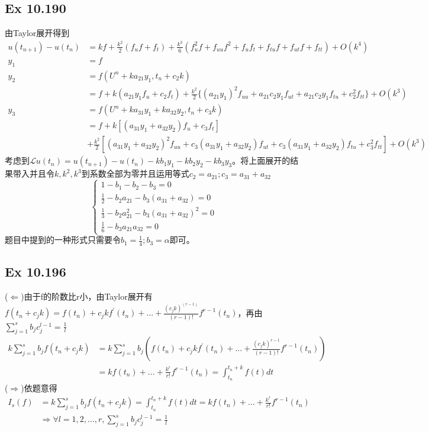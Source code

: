 \documentclass{article}
\begin{document}
\subsection*{Ex 10.190}
\indent 由Taylor展开得到
\begin{equation*}
  \begin{aligned}
    	u(t_{n+1})-u(t_{n})&=kf+\frac{k^2}{2}(f_{u}f+f_{t})+\frac{k^3}{6}(f_{u}^{2}f+f_{uu}f^2+f_{u}f_{t}+f_{tu}f+f_{ut}f+f_{tt})+O(k^4)\\
	y_1&=f\\
	y_2&=f(U^n+ka_{21}y_1,t_n+c_2k)\\
	     &=f+k(a_{21}y_1f_u+c_2f_t)+\frac{k^2}{2}\{(a_{21}y_1)^2f_{uu}+a_{21}c_2y_1f_{ut}+a_{21}c_2y_1f_{tu}+c_2^2f_{tt}\}+O(k^3)\\
	y_3&=f(U^n+ka_{31}y_1+ka_{32}y_2,t_n+c_3k)\\
	     &=f+k[(a_{31}y_1+a_{32}y_2)f_u+c_3f_t]\\
	     &+\frac{k^2}{2}[(a_{31}y_1+a_{32}y_2)^2f_{uu}+c_3(a_{31}y_1+a_{32}y_2)f_{ut}+c_3(a_{31}y_1+a_{32}y_2)f_{tu}+c_3^2f_{tt}]+O(k^3)
  \end{aligned}
\end{equation*}
考虑到$\mathcal{L}u(t_n)=u(t_{n+1})-u(t_n)-kb_1y_1-kb_2y_2-kb_3y_3$。将上面展开的结果带入并且令$k,k^2,k^3$到系数全部为零并且运用等式$c_2=a_{21};c_3=a_{31}+a_{32}$
\begin{equation*}
\left\{
\begin{aligned}
1-b_1-b_2-b_3=0\\
\frac{1}{2}-b_2a_{21}-b_3(a_{31}+a_{32})=0\\
\frac{1}{3}-b_2a_{21}^2-b_3(a_{31}+a_{32})^2=0\\
\frac{1}{6}-b_3a_{21}a_{32}=0
\end{aligned}
\right.
\end{equation*}
题目中提到的一种形式只需要令$b_1=\frac{1}{4};b_3=\alpha$即可。

\subsection*{Ex 10.196}
($\Leftarrow$)由于f的阶数比r小，由Taylor展开有$f(t_n+c_jk)=f(t_{n})+c_jkf^{'}(t_n)+...+\frac{(c_jk)^(r-1)}{(r-1)!}f^{r-1}(t_n)$，再由$\sum_{j=1}^sb_jc_j^{l-1}=\frac{1}{l}$
\begin{equation*}
\begin{aligned}
k\sum_{j=1}^sb_jf(t_n+c_jk)&=k\sum_{j=1}^sb_j(f(t_n)+c_jkf^{'}(t_n)+...+\frac{(c_jk)^{r-1}}{(r-1)!}f^{r-1}(t_n))\\
	&=kf(t_n)+...+\frac{k^r}{r!}f^{r-1}(t_n)=\int_{t_n}^{t_n+k}f(t)dt
\end{aligned}
\end{equation*}
($\Rightarrow$)依题意得
\begin{equation*}
\begin{aligned}
I_s(f)&=k\sum_{j=1}^sb_jf(t_n+c_jk)=\int_{t_n}^{t_n+k}f(t)dt=kf(t_n)+...+\frac{k^r}{r!}f^{r-1}(t_n)\\
&\Rightarrow \forall l = 1,2,...,r,\sum_{j=1}^sb_jc_j^{l-1}=\frac{1}{l}
\end{aligned}
\end{equation*}
\end{document}
